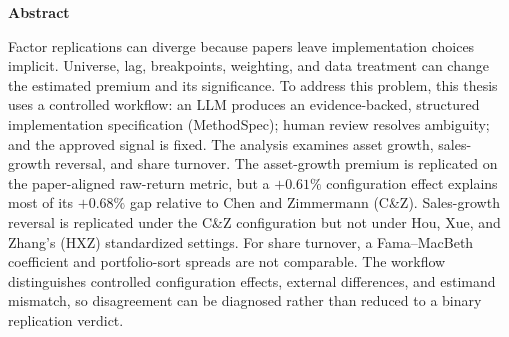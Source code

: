 \documentclass[
  11pt,
  oneside,
  english,
  singlespacing,
  liststotoc,
  headsepline
]{MastersDoctoralThesis}
\begin{document}
\begin{center}
  \LARGE \textbf{Abstract}
\end{center}
\vspace{1cm}

Factor replications can diverge because papers leave implementation choices
implicit. Universe, lag, breakpoints, weighting, and data treatment can change
the estimated premium and its significance. To address this problem, this
thesis uses a controlled workflow: an LLM produces an evidence-backed,
structured implementation specification (MethodSpec); human review resolves
ambiguity; and the approved signal is fixed. The analysis examines asset
growth, sales-growth reversal, and share turnover. The
asset-growth premium is replicated on the paper-aligned raw-return metric, but
a $+0.61\%$ configuration effect explains most of its $+0.68\%$ gap relative
to Chen and Zimmermann (C\&Z). Sales-growth reversal is replicated under the C\&Z
configuration but not under Hou, Xue, and Zhang's (HXZ) standardized settings.
For share turnover, a Fama--MacBeth coefficient and portfolio-sort spreads are
not comparable. The workflow distinguishes controlled configuration effects,
external differences, and estimand mismatch, so disagreement can be diagnosed
rather than reduced to a binary replication verdict.

\cleardoublepage

\tableofcontents

\begingroup
\makeatletter
\let\oldaddvspace\addvspace
\renewcommand*\addvspace[1]{}
\listoftables
\listoffigures
\let\addvspace\oldaddvspace
\makeatother
\endgroup

\pagestyle{scrheadings}
\end{document}
